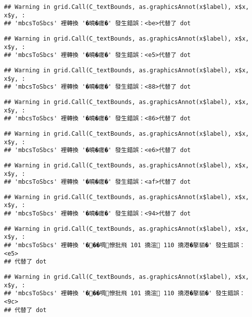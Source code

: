 \documentclass[
]{article}
\begin{document}
\begin{verbatim}
## Warning in grid.Call(C_textBounds, as.graphicsAnnot(x$label), x$x, x$y, :
## 'mbcsToSbcs' 裡轉換 '�曉�瘥�' 發生錯誤：<be>代替了 dot
\end{verbatim}

\begin{verbatim}
## Warning in grid.Call(C_textBounds, as.graphicsAnnot(x$label), x$x, x$y, :
## 'mbcsToSbcs' 裡轉換 '�曉�瘥�' 發生錯誤：<e5>代替了 dot
\end{verbatim}

\begin{verbatim}
## Warning in grid.Call(C_textBounds, as.graphicsAnnot(x$label), x$x, x$y, :
## 'mbcsToSbcs' 裡轉換 '�曉�瘥�' 發生錯誤：<88>代替了 dot
\end{verbatim}

\begin{verbatim}
## Warning in grid.Call(C_textBounds, as.graphicsAnnot(x$label), x$x, x$y, :
## 'mbcsToSbcs' 裡轉換 '�曉�瘥�' 發生錯誤：<86>代替了 dot
\end{verbatim}

\begin{verbatim}
## Warning in grid.Call(C_textBounds, as.graphicsAnnot(x$label), x$x, x$y, :
## 'mbcsToSbcs' 裡轉換 '�曉�瘥�' 發生錯誤：<e6>代替了 dot
\end{verbatim}

\begin{verbatim}
## Warning in grid.Call(C_textBounds, as.graphicsAnnot(x$label), x$x, x$y, :
## 'mbcsToSbcs' 裡轉換 '�曉�瘥�' 發生錯誤：<af>代替了 dot
\end{verbatim}

\begin{verbatim}
## Warning in grid.Call(C_textBounds, as.graphicsAnnot(x$label), x$x, x$y, :
## 'mbcsToSbcs' 裡轉換 '�曉�瘥�' 發生錯誤：<94>代替了 dot
\end{verbatim}

\begin{verbatim}
## Warning in grid.Call(C_textBounds, as.graphicsAnnot(x$label), x$x, x$y, :
## 'mbcsToSbcs' 裡轉換 '���啁憭批飛 101 撟渲 110 撟港�摮貊�' 發生錯誤：<e5>
## 代替了 dot
\end{verbatim}

\begin{verbatim}
## Warning in grid.Call(C_textBounds, as.graphicsAnnot(x$label), x$x, x$y, :
## 'mbcsToSbcs' 裡轉換 '���啁憭批飛 101 撟渲 110 撟港�摮貊�' 發生錯誤：<9c>
## 代替了 dot
\end{verbatim}
\end{document}
